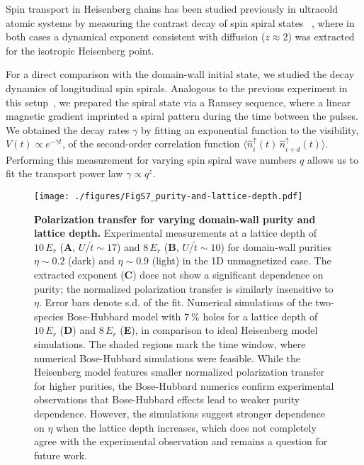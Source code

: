 \documentclass[
 reprint,
 superscriptaddress,
 amsmath,amssymb,
 aps,
 pra,
]{revtex4-2}
\newcommand{\avg}[1]{\ensuremath{\langle #1 \rangle}\xspace}%
\begin{document}
Spin transport in Heisenberg chains has been studied previously in ultracold atomic systems by measuring the contrast decay of spin spiral states ~\cite{Hild2014,Jepsen2020}, where in both cases a dynamical exponent consistent with diffusion ($z \approx 2$) was extracted for the isotropic Heisenberg point.

For a direct comparison with the domain-wall initial state, we studied the decay dynamics of longitudinal spin spirals. Analogous to the previous experiment in this setup~\cite{Hild2014}, we prepared the spiral state via a Ramsey sequence, where a linear magnetic gradient imprinted a spiral pattern during the time between the pulses. We obtained the decay rates $\gamma$ by fitting an exponential function to the visibility, $V (t) \propto e^{-\gamma t}$, of the second-order correlation function $\avg{\hat{n}_i^\uparrow (t)\,\hat{n}_{i+d}^\uparrow (t)} $. Performing this measurement for varying spin spiral wave numbers $q$ allows us to fit the transport power law $\gamma \propto q^z$.

\begin{figure*}
    \centering
    \texttt{[image: ./figures/FigS7\_purity-and-lattice-depth.pdf]}
    \caption{\textbf{Polarization transfer for varying domain-wall purity and lattice depth.}
        Experimental measurements at a lattice depth of $10\,E_r$ (\textbf{A}, $U/\tilde{t} \sim 17$) and $8\,E_r$ (\textbf{B}, $U/\tilde{t} \sim 10$) for domain-wall purities $\eta \sim 0.2$ (dark) and $\eta \sim 0.9$ (light) in the 1D unmagnetized case. The extracted exponent (\textbf{C}) does not show a significant dependence on purity; the normalized polarization transfer is similarly insensitive to $\eta$. Error bars denote s.d. of the fit.
        Numerical simulations of the two-species Bose-Hubbard model with $\SI{7}{\percent}$ holes for a lattice depth of $10\,E_r$ (\textbf{D}) and $8\,E_r$ (\textbf{E}), in comparison to ideal Heisenberg model simulations. The shaded regions mark the time window, where numerical Bose-Hubbard simulations were feasible.
        While the Heisenberg model features smaller normalized polarization transfer for higher purities, the Bose-Hubbard numerics confirm experimental observations that Bose-Hubbard effects lead to weaker purity dependence. However, the simulations suggest stronger dependence on $\eta$ when the lattice depth increases, which does not completely agree with the experimental observation and remains a question for future work.
    }
    \label{fig:purity-ldepth}
\end{figure*}
\end{document}
